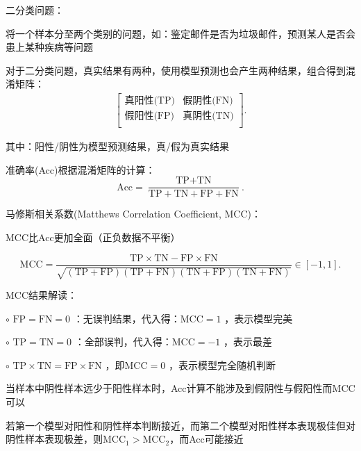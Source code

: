 \begin{notation}
    二分类问题：
    
    将一个样本分至两个类别的问题，如：鉴定邮件是否为垃圾邮件，预测某人是否会患上某种疾病等问题
\end{notation}
对于二分类问题，真实结果有两种，使用模型预测也会产生两种结果，组合得到混淆矩阵：
\begin{align*}
    \begin{bmatrix}
        \text{真阳性(TP)} & \text{假阴性(FN)}\\
        \text{假阳性(FP)} & \text{真阴性(TN)}\\
    \end{bmatrix}
.\end{align*}

其中：阳性/阴性为模型预测结果，真/假为真实结果

准确率(Acc)根据混淆矩阵的计算：
\[
    \text{Acc}=\frac{\text{TP}+\text{TN}}{\text{TP}+\text{TN}+\text{FP}+\text{FN}} 
.\] 
\begin{notation}
    马修斯相关系数(Matthews Correlation Coefficient, MCC)：

    MCC比Acc更加全面（正负数据不平衡）
\end{notation}
\[
    \text{MCC}=\frac{\text{TP}\times \text{TN}-\text{FP}\times \text{FN}}{\sqrt{\left( \text{TP}+\text{FP} \right) \left( \text{TP}+\text{FN} \right) \left( \text{TN}+\text{FP} \right) \left( \text{TN}+\text{FN} \right) } } \in [-1,1]
.\] 
\begin{notation}
    MCC结果解读：

    $\circ$ $\text{FP}=\text{FN}=0$ ：无误判结果，代入得：$\text{MCC}=1$ ，表示模型完美

    $\circ$ $\text{TP}=\text{TN}=0$ ：全部误判，代入得：$\text{MCC}=-1$ ，表示最差

    $\circ$ $\text{TP}\times \text{TN}=\text{FP}\times \text{FN}$ ，即$\text{MCC}=0$ ，表示模型完全随机判断

    当样本中阴性样本远少于阳性样本时，Acc计算不能涉及到假阴性与假阳性而MCC可以

    若第一个模型对阳性和阴性样本判断接近，而第二个模型对阳性样本表现极佳但对阴性样本表现极差，则$\text{MCC}_1>\text{MCC}_2$，而Acc可能接近
\end{notation}

